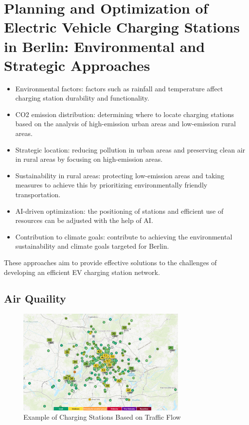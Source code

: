 \section{Planning and Optimization of Electric Vehicle Charging Stations in Berlin: Environmental and Strategic Approaches}
\begin{itemize}
    \item Environmental factors: factors such as rainfall and temperature affect charging station durability and functionality.
    \item CO2 emission distribution: determining where to locate charging stations based on the analysis of high-emission urban areas and low-emission rural areas.
    \item Strategic location: reducing pollution in urban areas and preserving clean air in rural areas by focusing on high-emission areas.
    \item Sustainability in rural areas: protecting low-emission areas and taking measures to achieve this by prioritizing environmentally friendly transportation.
    \item AI-driven optimization: the positioning of stations and efficient use of resources can be adjusted with the help of AI.
    \item Contribution to climate goals: contribute to achieving the environmental sustainability and climate goals targeted for Berlin.
\end{itemize}
These approaches aim to provide effective solutions to the challenges of developing an efficient EV charging station network.

\subsection{Air Quaility}\label{sec:42}

\begin{figure}[H]
\begin{center}
\includegraphics[width=0.75\textwidth]{Bilder/kaan1.png}
\caption{Example of Charging Stations Based on Traffic Flow}\label{fig:kaan1}
\end{center}
\end{figure}



